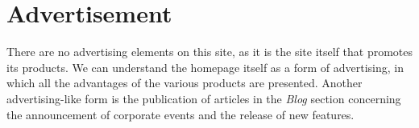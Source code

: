 \section{Advertisement}

There are no advertising elements on this site, as it is the site itself 
that promotes its products. We can understand the homepage itself as a 
form of advertising, in which all the advantages of the various products 
are presented. Another advertising-like form is the publication of articles 
in the \textit{Blog} section concerning the announcement of corporate 
events and the release of new features.